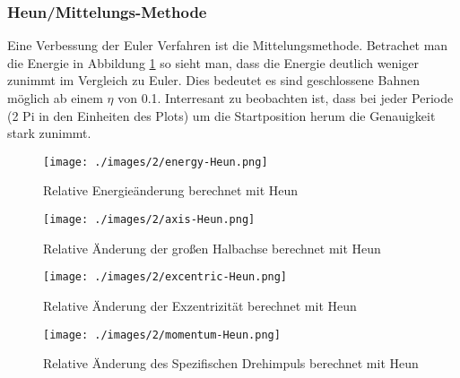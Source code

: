 \subsubsection{Heun/Mittelungs-Methode}
Eine Verbessung der Euler Verfahren ist die Mittelungsmethode.
Betrachet man die Energie in Abbildung \ref{fig:2body:heun:energy}
so sieht man, dass die Energie deutlich weniger zunimmt im Vergleich zu Euler.
Dies bedeutet es sind geschlossene Bahnen möglich ab einem $\eta$ von 0.1.\newline
Interresant zu beobachten ist, dass bei jeder Periode (2 Pi in den Einheiten des Plots)
um die Startposition herum die Genauigkeit stark zunimmt.
\begin{figure}
  \begin{center}
    \texttt{[image: ./images/2/energy-Heun.png]}
  \end{center}
  \caption{Relative Energieänderung berechnet mit Heun}
  \label{fig:2body:heun:energy}
\end{figure}
\begin{figure}
  \begin{center}
    \texttt{[image: ./images/2/axis-Heun.png]}
  \end{center}
  \caption{Relative \"Anderung der großen Halbachse berechnet mit Heun}
  \label{fig:2body:heun:axis}
\end{figure}
\begin{figure}
  \begin{center}
    \texttt{[image: ./images/2/excentric-Heun.png]}
  \end{center}
  \caption{Relative \"Anderung der Exzentrizität berechnet mit Heun}
  \label{fig:2body:heun:excentric}
\end{figure}
\begin{figure}
  \begin{center}
    \texttt{[image: ./images/2/momentum-Heun.png]}
  \end{center}
  \caption{Relative \"Anderung des Spezifischen Drehimpuls berechnet mit Heun}
  \label{fig:2body:heun:spec_angular_momentum}
\end{figure}
